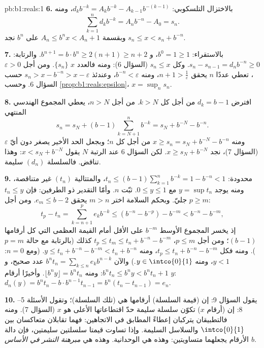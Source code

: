 \begin{solution}{pb:b1:reals:1}
\textbf{6.} بالاختزال التلسكوبي: $d_k b^{-k} = A_k b^{-k} - A_{k-1}
b^{-(k-1)}$، ومنه
\[
\sum_{k=1}^n d_k b^{-k} = A_n b^{-n} - A_0 = s_n .
\]
وبقسمة $A_n \leq b^n x < A_n + 1$ على $b^n$ نجد $s_n \leq x <
s_n + b^{-n}$.

\textbf{7.} بالاستقراء: $b^0 = 1 \geq 1$، و $b^{n+1} = b \cdot
b^n \geq 2(n + 1) \geq n + 2$. والرتابة: $s_n - s_{n-1} = d_n
b^{-n} \geq 0$. وكل $s_n \leq x$ (السؤال 6): ومنه فالعدد $x$   $\{s_n\}$. ومن أجل $\varepsilon > 0$، تعطي  عددًا $n$ يحقق $n + 1 > \frac1\varepsilon$، ومنه
$b^{-n} < \varepsilon$، وعندئذ $s_n > x - b^{-n} > x -
\varepsilon$ حسب السؤال 6. وحسب \cref{prop:b1:reals:epsilon}، $x =
\sup_n s_n$.

\textbf{8.} افترض $d_k = b - 1$ من أجل كل $k > N$. من أجل $n > N$،
يعطي المجموع الهندسي المنتهي
\[
s_n = s_N + (b - 1)\sum_{k=N+1}^{n} b^{-k}
= s_N + b^{-N} - b^{-n} .
\]
ومنه $x \geq s_n = s_N + b^{-N} - b^{-n}$ من أجل كل $n$؛ وبجعل
الحد الأخير يصغر دون أيّ $\varepsilon$ (السؤال 7)، نجد $x
\geq s_N + b^{-N}$. لكن السؤال 6 عند الرتبة $N$ يقول $x < s_N +
b^{-N}$: وهذا تناقض. فالسلسلة $(d_n)$ سليمة.

\textbf{9.} محدودة: $t_n \leq (b-1)\sum_{k=1}^n b^{-k} = 1 -
b^{-n} < 1$، والمتتالية $(t_n)$ غير متناقصة، ومنه يوجد $y = \sup t_n$
مع $0 \leq y \leq 1$. ثبّت $n$. وأمّا التقدير
ذو الطرفين: فإن $t_n \leq y$ جليّ. وبحكم السلامة اختر $m > n$ يحقق
$e_m \leq b - 2$. ومن أجل $p \geq m$:
\[
t_p - t_n = \sum_{k=n+1}^{p} e_k b^{-k}
\leq (b^{-n} - b^{-p}) - b^{-m} < b^{-n} - b^{-m},
\]
إذ يخسر المجموع الأوسط $b^{-m}$ على الأقل أمام القيمة العظمى التي
كل أرقامها $(b-1)$؛ ومن أجل $p \leq m$، $t_p \leq t_m \leq t_n + b^{-n} -
b^{-m}$ كذلك (بالرتابة مع حالة $p = m$). ومنه فكل
$t_p \leq t_n + b^{-n} - b^{-m}$، ومنه $y \leq t_n + b^{-n} -
b^{-m} < t_n + b^{-n}$. (ومع $n = 0$: $y < 1$، ومنه $y \in
\intco{0}{1}$.) والآن $b^n t_n = \sum_{k \leq n} e_k b^{n-k}$ عدد
صحيح، و $b^n t_n \leq b^n y < b^n t_n + 1$: ومنه $\lfloor b^n
y \rfloor = b^n t_n$. وأخيرًا أرقام $y$: $d_n(y) = b^n
t_n - b \cdot b^{n-1} t_{n-1} = b^n(t_n - t_{n-1}) = e_n$.

\textbf{10.} يقول السؤال 9: إن (قيمة السلسلة) أرقامها هي (تلك
السلسلة)؛ وتقول الأسئلة 5--8: إن (أرقام $x$) تكوّن سلسلة سليمة
حدّ اقتطاعاتها الأعلى هو $x$ (السؤال 7). ومنه فالتطبيقان
يتركبان إعطاءً  المطابق في الاتجاهين: فهما تقابلان
متعاكسان بين $\intco{0}{1}$ والسلاسل السليمة. وإذا تساوت قيمتا
سلسلتين سليمتين، فإن  دالة الأرقام يجعلهما
متساويتين: وهذه هي الوحدانية. وهذه هي \emph{مبرهنة النشر في
الأساس $b$}.


\end{solution}
